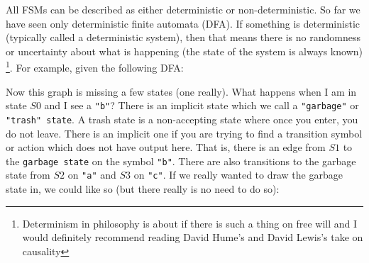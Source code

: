 \documentclass[main.tex]{subfiles}
\begin{document}
All FSMs can be described as either deterministic or non-deterministic. So far we have seen only deterministic finite automata (DFA). If something is deterministic (typically called a deterministic system), then that means there is no randomness or uncertainty about what is happening (the state of the system is always known) \footnote{Determinism in philosophy is about if there is such a thing on free will and I would definitely recommend reading David Hume's and David Lewis's take on causality}. For example, given the following DFA:
\begin{center}
\end{center}
Now this graph is missing a few states (one really). What happens when I am in state $S0$ and I see a \texttt{"b"}? There is an implicit state which we call a \texttt{"garbage"} or \texttt{"trash" state}. A trash state is a non-accepting state where once you enter, you do not leave. There is an implicit one if you are trying to find a transition symbol or action which does not have output here. That is, there is an edge from $S1$ to the \texttt{garbage state} on the symbol \texttt{"b"}. There are also transitions to the garbage state from $S2$ on \texttt{"a"} and $S3$ on \texttt{"c"}. If we really wanted to draw the garbage state in, we could like so (but there really is no need to do so):
\end{document}
